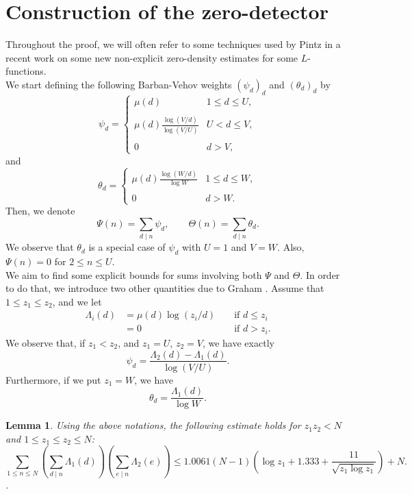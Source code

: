\documentclass[reqno]{amsart}
\newtheorem{lemma}[theorem]{Lemma}
\numberwithin{equation}{section}
\theoremstyle{remark}
\begin{document}
\section{Construction of the zero-detector}\label{zerodetector}
Throughout the proof, we will often refer to some techniques used by Pintz in a recent work \cite{pintz_new_2019} on some new non-explicit zero-density estimates for some $L$-functions.\\
We start defining the following Barban-Vehov weights $\left(\psi_d\right)_d$ and $\left(\theta_d\right)_d$ by
$$
\psi_d=\left\{\begin{array}{ll}
\mu(d) & 1 \leq d \leq U, \\ \\
\mu(d) \frac{\log (V / d)}{\log (V / U)} & U<d \leq V, \\ \\
0 & d>V,
\end{array} \right.
$$
and
$$\theta_d=\left\{\begin{array}{ll}
\mu(d) \frac{\log (W / d)}{\log W} & 1 \leq d \leq W, \\ \\
0 & d>W.
\end{array}\right.$$
Then, we denote
\begin{equation}\label{definepsisquare}
    \Psi(n)=\sum_{d \mid n} \psi_d,\qquad \Theta(n)=\sum_{d \mid n} \theta_d.
\end{equation}
We observe that $\theta_d$ is a special case of $\psi_d$ with $U=1$ and $V=W$. Also, $\Psi(n)=0$ for $2\le n\le U$.\\We aim to find some explicit bounds for sums involving both $\Psi$ and $\Theta$. In order to do that, we introduce two other quantities due to Graham \cite{GRAHAM197883}. 
Assume that $1 \leq  z_1 \leq  z_2$, and we let
$$
\begin{aligned}
\Lambda_i(d) & =\mu(d) \log \left(z_i / d\right) & & \text { if } d \leq  z_i \\
& =0 & & \text { if } d>z_i .
\end{aligned}
$$
We observe that, if $z_1<z_2$, and $z_1=U$, $z_2=V$, we have exactly
\begin{equation}\label{psiandlam}
    \psi_d=\frac{\Lambda_2(d)-\Lambda_1(d)}{\log(V/U)}.
\end{equation}
Furthermore, if we put $z_1=W$, we have
\begin{equation*}
    \theta_d=\frac{\Lambda_1(d)}{\log W}.
\end{equation*}
\begin{lemma}\label{grahamz1z2small}
Using the above notations, the following estimate holds for $z_1z_2<N$ and $1\le z_1\le z_2\le N$:
\begin{equation*}
\sum_{1 \leq  n \leq  N}\left(\sum_{d \mid n} \Lambda_1(d)\right)\left(\sum_{e \mid n} \Lambda_2(e)\right)\le 1.0061(N-1) \left(\log z_1+1.333+\frac{11}{\sqrt{z_1\log z_1}}\right)+N.
\end{equation*}.
\end{lemma}
\end{document}
